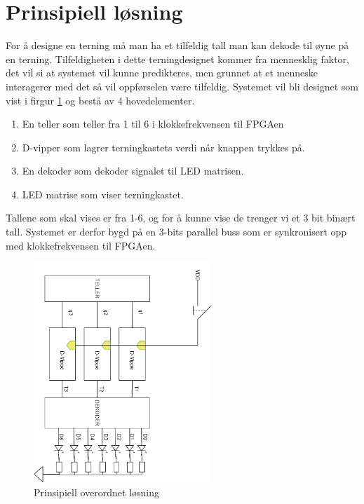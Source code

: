 \newpage
\section{Prinsipiell løsning}

\label{prinsipiellLoesning}



For å designe en terning må man ha et tilfeldig tall man kan dekode til øyne på en terning. Tilfeldigheten i dette terningdesignet kommer fra mennesklig faktor, det vil si at systemet vil kunne predikteres, men grunnet at et menneske interagerer med det så vil oppførselen være tilfeldig. Systemet vil bli designet som vist i firgur \ref{fig:Fig1} og bestå av 4 hovedelementer. 
\begin{enumerate}
  \item En teller som teller fra 1 til 6 i klokkefrekvensen til FPGAen
  \item D-vipper som lagrer terningkastets verdi når knappen trykkes på.
  \item En dekoder som dekoder signalet til LED matrisen.
  \item LED matrise som viser terningkastet.
\end{enumerate}
Tallene som skal vises er fra 1-6, og for å kunne vise de trenger vi et 3 bit binært tall. Systemet er derfor bygd på en 3-bits parallel buss som er synkronisert opp med klokkefrekvensen til FPGAen.

\begin{figure}[!h]
  \centering
  \includegraphics[width=0.6\textwidth,angle = 90]{Bilder/overordnet.png} 
  \caption{Prinsipiell overordnet løsning}
  \label{fig:Fig1}
\end{figure}
